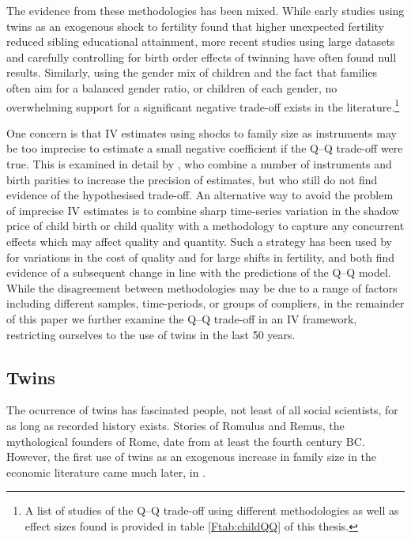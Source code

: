 The evidence from these methodologies has been mixed. While early studies using 
twins as an exogenous shock to fertility found that higher unexpected fertility
reduced sibling educational attainment, more recent studies using large datasets
and carefully controlling for birth order effects of twinning have often found
null results.  Similarly, using the gender mix of children and the fact that
families often aim for a balanced gender ratio, or children of each gender,
no overwhelming support for a significant negative trade-off exists in the 
literature.\footnote{A list of studies of the Q--Q trade-off using different
methodologies as well as effect sizes found is provided in table 
\ref{Ftab:childQQ} of this thesis.}  

One concern is that IV estimates using shocks to family size as instruments may 
be too imprecise to estimate a small negative coefficient if the Q--Q trade-off 
were true.  This is examined in detail by \citet{Angristetal2010}, who combine a 
number of instruments and birth parities to increase the precision of estimates, 
but who still do not find evidence of the hypothesised trade-off. An alternative 
way to avoid the problem of imprecise IV estimates is to combine sharp 
time-series variation in the shadow price of child birth or child quality with 
a methodology to capture any concurrent effects which may affect quality and
quantity. Such a strategy has been used by \citet{BleakleyLange2009} for 
variations in the cost of quality and \citep{DalgaardStrulik2015} for large 
shifts in fertility, and both find evidence of a subsequent change in line with
the predictions of the Q--Q model. While the disagreement between methodologies
may be due to a range of factors including different samples, time-periods, or
groups of compliers, in the remainder of this paper we further examine the Q--Q
trade-off in an IV framework, restricting ourselves to the use of twins in the 
last 50 years.

\subsection{Twins}
The ocurrence of twins has fascinated people, not least of all social 
scientists, for as long as recorded history exists. Stories of Romulus and 
Remus, the mythological founders of Rome, date from at least the fourth century 
BC. However, the first use of twins as an exogenous increase in family size in 
the economic literature came much later, in \citet{RosenzweigWolpin1980}.

